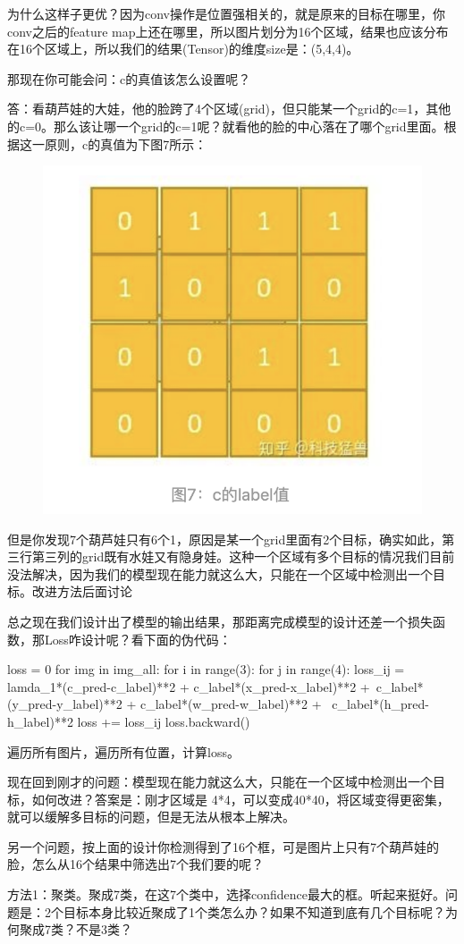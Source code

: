 \documentclass[12pt]{article}
\begin{document}
为什么这样子更优？因为conv操作是位置强相关的，就是原来的目标在哪里，你conv之后的feature map上还在哪里，所以图片划分为16个区域，结果也应该分布在16个区域上，所以我们的结果(Tensor)的维度size是：(5,4,4)。

那现在你可能会问：c的真值该怎么设置呢？

答：看葫芦娃的大娃，他的脸跨了4个区域(grid)，但只能某一个grid的c=1，其他的c=0。那么该让哪一个grid的c=1呢？就看他的脸的中心落在了哪个grid里面。根据这一原则，c的真值为下图7所示：
\begin{figure}[H]
    \centering
    \includegraphics[width=.4\textwidth]{fig/Yolo_Series_2.png}
\end{figure}

但是你发现7个葫芦娃只有6个1，原因是某一个grid里面有2个目标，确实如此，第三行第三列的grid既有水娃又有隐身娃。这种一个区域有多个目标的情况我们目前没法解决，因为我们的模型现在能力就这么大，只能在一个区域中检测出一个目标。改进方法后面讨论

总之现在我们设计出了模型的输出结果，那距离完成模型的设计还差一个损失函数，那Loss咋设计呢？看下面的伪代码：
\begin{python}
loss = 0
for img in img_all:
   for i in range(3):
      for j in range(4):
         loss_ij = lamda_1*(c_pred-c_label)**2 + c_label*(x_pred-x_label)**2 +\
                     c_label*(y_pred-y_label)**2 + c_label*(w_pred-w_label)**2 + \
                     c_label*(h_pred-h_label)**2
         loss += loss_ij
loss.backward()
\end{python}

遍历所有图片，遍历所有位置，计算loss。

现在回到刚才的问题：模型现在能力就这么大，只能在一个区域中检测出一个目标，如何改进？答案是：刚才区域是 4*4，可以变成40*40，将区域变得更密集，就可以缓解多目标的问题，但是无法从根本上解决。

另一个问题，按上面的设计你检测得到了16个框，可是图片上只有7个葫芦娃的脸，怎么从16个结果中筛选出7个我们要的呢？

方法1：聚类。聚成7类，在这7个类中，选择confidence最大的框。听起来挺好。问题是：2个目标本身比较近聚成了1个类怎么办？如果不知道到底有几个目标呢？为何聚成7类？不是3类？
\end{document}
